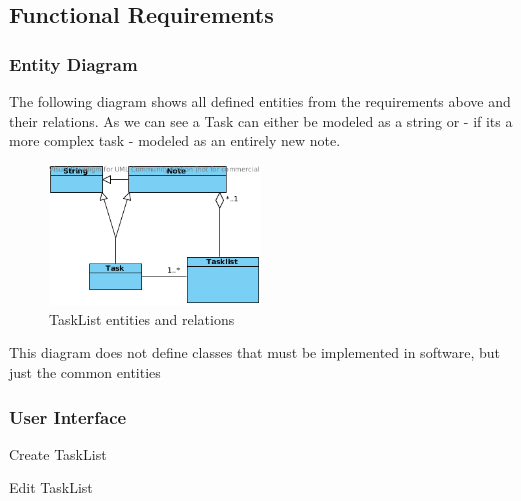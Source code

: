 \subsection{Functional Requirements}
\label{requirements:functional}
    \subsubsection{Entity Diagram}
    The following diagram shows all defined entities from the requirements above and their relations.
    As we can see a Task can either be modeled as a string or - if its a more complex task - modeled as an entirely new note.
    \begin{figure}[h]
	    \centering
        \includegraphics[width=0.5\textwidth]{graphics/entity_diagram.png}
        \caption{TaskList entities and relations}
        \label{entities_relations}
    \end{figure}
    
    This diagram does not define classes that must be implemented in software, but just the common entities



    \subsubsection{User Interface} %
    \label{requirements:interfaces:user}

    \begin{requirement}{Create TaskList}
    \end{requirement}

    \begin{requirement}{Edit TaskList}
    \end{requirement}

